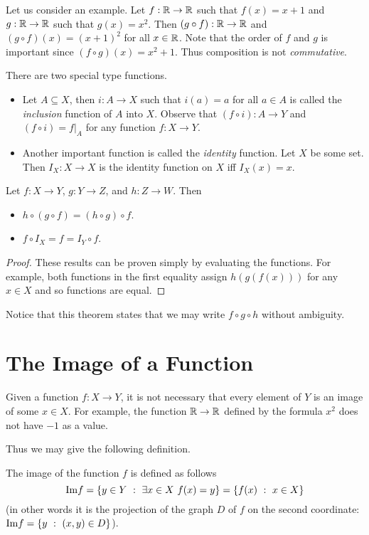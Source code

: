 Let us consider an example. Let $f : \mathbb{R} \to \mathbb{R}$ such that $f(x) = x + 1$ and
$g : \mathbb{R} \to \mathbb{R}$ such that $g(x) = x^2$. Then $(g \circ f) : \mathbb{R} \to \mathbb{R}$ and
$(g \circ f)(x) = (x + 1)^2$ for all $x \in \mathbb{R}$. Note that the order of $f$ and
$g$ is important since $(f \circ g)(x) = x^2 + 1$. Thus composition is not
\emph{commutative}.

There are two special type functions.
\begin{itemize}
  \item Let $A \subseteq X$, then $i : A \to X$ such that $i(a) = a$ for all
    $a \in A$ is called the \emph{inclusion} function of $A$ into $X$. Observe
    that $(f \circ i) : A \to Y$ and $(f \circ i) = f|_A$
    for any function $f : X \to Y$.
  \item Another important function is called the \emph{identity} function.
    Let $X$ be some set. Then $I_X : X \to X$ is the identity function on $X$
    iff $I_X(x) = x$.
\end{itemize}

\begin{theorem}
  Let $f : X \to Y$, $g : Y \to Z$, and $h : Z \to W$. Then
  \begin{itemize}
    \item $h \circ (g \circ f) = (h \circ g) \circ f$.
    \item $f \circ I_X = f = I_Y \circ f$.
  \end{itemize}
\end{theorem}
\begin{proof}
  These results can be proven simply by evaluating the functions. For example,
  both functions in the first equality assign $h(g(f(x)))$ for any $x \in X$
  and so functions are equal.
\end{proof}
Notice that this theorem states that we may write $f \circ g \circ h$ without
ambiguity.

\section{The Image of a Function}
Given a function $f : X \to Y$, it is not necessary that every element of $Y$
is an image of some $x \in X$. For example, the function $\mathbb{R} \to \mathbb{R}$ defined by
the formula $x^2$ does not have $-1$ as a value.

Thus we may give the following definition.
\begin{definition}
  The image of the function $f$ is defined as follows
  \[
    \Im f = \set[\exists x \in X\ f(x) = y]{y \in Y}
    = \set[x \in X]{f(x)}
  \]
  (in other words it is the projection of the graph $D$ of $f$ on the second
  coordinate: $\Im f = \set[(x, y) \in D]{y}$).
\end{definition}

